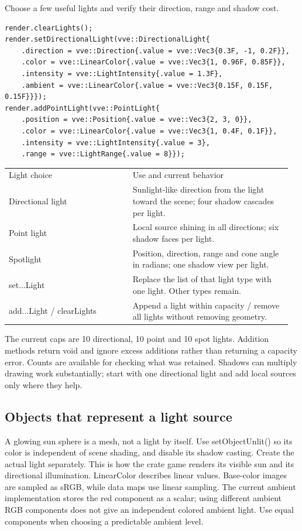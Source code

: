 \documentclass[11pt,a4paper]{article}
\begin{document}
\label{core-67}
Choose a few useful lights and verify their direction, range and shadow cost.

\begin{lstlisting}[language={}]
render.clearLights();
render.setDirectionalLight(vve::DirectionalLight{
    .direction = vve::Direction{.value = vve::Vec3{0.3F, -1, 0.2F}},
    .color = vve::LinearColor{.value = vve::Vec3{1, 0.96F, 0.85F}},
    .intensity = vve::LightIntensity{.value = 1.3F},
    .ambient = vve::LinearColor{.value = vve::Vec3{0.15F, 0.15F, 0.15F}}});
render.addPointLight(vve::PointLight{
    .position = vve::Position{.value = vve::Vec3{2, 3, 0}},
    .color = vve::LinearColor{.value = vve::Vec3{1, 0.4F, 0.1F}},
    .intensity = vve::LightIntensity{.value = 3},
    .range = vve::LightRange{.value = 8}});
\end{lstlisting}

{\small
\begin{longtable}{@{}p{0.42\linewidth}p{0.54\linewidth}@{}}
Light choice & Use and current behavior \\
Directional light & Sunlight-like direction from the light toward the scene; four shadow cascades per light. \\
Point light & Local source shining in all directions; six shadow faces per light. \\
Spotlight & Position, direction, range and cone angle in radians; one shadow view per light. \\
set...Light & Replace the list of that light type with one light. Other types remain. \\
add...Light / clearLights & Append a light within capacity / remove all lights without removing geometry. \\
\end{longtable}
}

The current caps are 10 directional, 10 point and 10 spot lights. Addition methods return void and ignore excess additions rather than returning a capacity error. Counts are available for checking what was retained. Shadows can multiply drawing work substantially; start with one directional light and add local sources only where they help.

\subsection*{Objects that represent a light source}
A glowing sun sphere is a mesh, not a light by itself. Use setObjectUnlit() so its color is independent of scene shading, and disable its shadow casting. Create the actual light separately. This is how the crate game renders its visible sun and its directional illumination. LinearColor describes linear values. Base-color images are sampled as sRGB, while data maps use linear sampling. The current ambient implementation stores the red component as a scalar; using different ambient RGB components does not give an independent colored ambient light. Use equal components when choosing a predictable ambient level.
\end{document}
